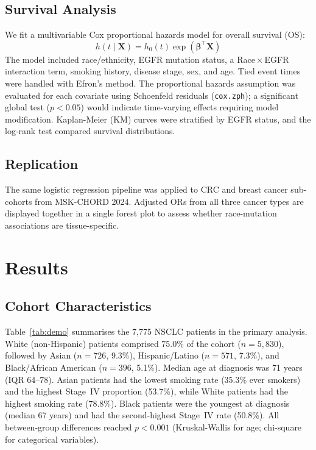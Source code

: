 \documentclass[12pt]{article}
\begin{document}
\subsection{Survival Analysis}

We fit a multivariable Cox proportional hazards model for overall survival (OS):
\begin{equation}
  h(t\mid\mathbf{X})
  = h_0(t)\exp\!\left(\boldsymbol{\beta}^{\!\top}\mathbf{X}\right)
\end{equation}
The model included race/ethnicity, EGFR mutation status, a
Race\,$\times$\,EGFR interaction term, smoking history, disease stage, sex,
and age.
Tied event times were handled with Efron's method.
The proportional hazards assumption was evaluated for each covariate using
Schoenfeld residuals (\texttt{cox.zph}); a significant global test ($p < 0.05$)
would indicate time-varying effects requiring model modification.
Kaplan-Meier (KM) curves were stratified by EGFR status, and the log-rank
test compared survival distributions.

\subsection{Replication}

The same logistic regression pipeline was applied to CRC and breast cancer
sub-cohorts from MSK-CHORD 2024.
Adjusted ORs from all three cancer types are displayed together in a single
forest plot to assess whether race-mutation associations are tissue-specific.

\section{Results}

\subsection{Cohort Characteristics}

Table~\ref{tab:demo} summarises the 7,775 NSCLC patients in the primary
analysis.
White (non-Hispanic) patients comprised 75.0\% of the cohort ($n = 5{,}830$),
followed by Asian ($n = 726$, 9.3\%), Hispanic/Latino ($n = 571$, 7.3\%), and
Black/African American ($n = 396$, 5.1\%).
Median age at diagnosis was 71 years (IQR 64--78).
Asian patients had the lowest smoking rate (35.3\% ever smokers) and the
highest Stage~IV proportion (53.7\%), while White patients had the highest
smoking rate (78.8\%).
Black patients were the youngest at diagnosis (median 67 years) and had the
second-highest Stage~IV rate (50.8\%).
All between-group differences reached $p < 0.001$ (Kruskal-Wallis for age;
chi-square for categorical variables).
\end{document}
